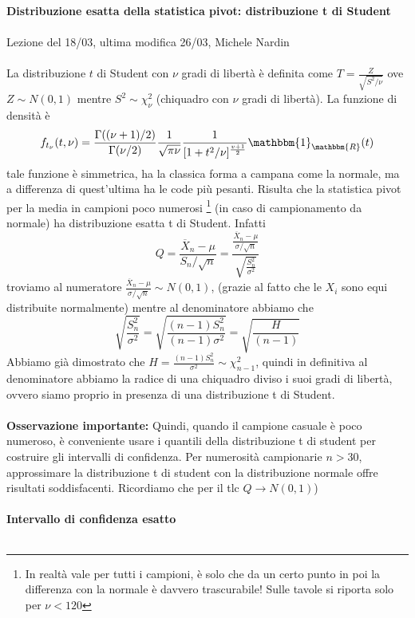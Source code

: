 

\noindent\textbf{Distribuzione esatta della statistica pivot: distribuzione t di Student}
\\ \\
Lezione del 18/03, ultima modifica 26/03, Michele Nardin
\\
\\
La distribuzione $t$ di Student con $\nu$ gradi di libertà è definita come 
$T=\frac{Z}{\sqrt{S^2 / \nu}}$ ove $Z \sim N(0,1)$ mentre $S^2 \sim \chi^2_\nu$ (chiquadro con $\nu$ gradi di libertà).
La funzione di densità è $$f_{t_\nu}(t,\nu)=\frac{\Gamma((\nu + 1)/2)}{\Gamma(\nu / 2)}
\frac{1}{\sqrt{\pi \nu}} \frac{1}{[1+t^2/\nu]^{\frac{v+1}{2}}} \mathbbm{1}_\mathbbm{R} (t)$$
tale funzione è simmetrica, ha la classica forma a campana come la normale, ma a differenza di quest'ultima ha le code più pesanti.
Risulta che la statistica pivot per la media in campioni poco numerosi 
\footnote{In realtà vale per tutti i campioni, è solo che da un certo punto in poi la differenza con la normale è davvero trascurabile! Sulle tavole si riporta solo per $\nu < 120$} (in caso di campionamento da normale) 
ha distribuzione esatta t di Student. Infatti 
$$Q=\frac{\overline{X}_n - \mu}{S_n / \sqrt{n}}=\frac{\frac{\overline{X}_n - \mu}{\sigma / \sqrt{n}}}{\sqrt{\frac{S^2_n}{\sigma^2}}}$$
troviamo al numeratore $\frac{\overline{X}_n - \mu}{\sigma / \sqrt{n}} \sim N(0,1)$, (grazie al fatto che le $X_i$ sono equi distribuite normalmente) 
mentre al denominatore abbiamo che 
$$\sqrt{\frac{S^2_n}{\sigma^2}}= \sqrt{\frac{(n-1)S^2_n}{(n-1) \sigma^2}}= \sqrt{\frac{H}{(n-1)}} $$
Abbiamo già dimostrato che $H=\frac{(n-1)S^2_n}{\sigma^2} \sim \chi^2_{n-1}$, quindi in definitiva al denominatore abbiamo la radice di una chiquadro diviso i suoi gradi di libertà, ovvero siamo proprio in presenza di una distribuzione t di Student.
\\ \\
\noindent\textbf{Osservazione importante:} Quindi, quando il campione casuale è poco numeroso, è conveniente usare i quantili della distribuzione t di student per costruire gli intervalli di confidenza. Per numerosità campionarie $n>30$, approssimare la distribuzione t di student con la distribuzione normale offre risultati soddisfacenti. Ricordiamo che per il tlc $Q\rightarrow N(0,1)$)
\\ \\
\noindent\textbf{Intervallo di confidenza esatto}
\\ \\
